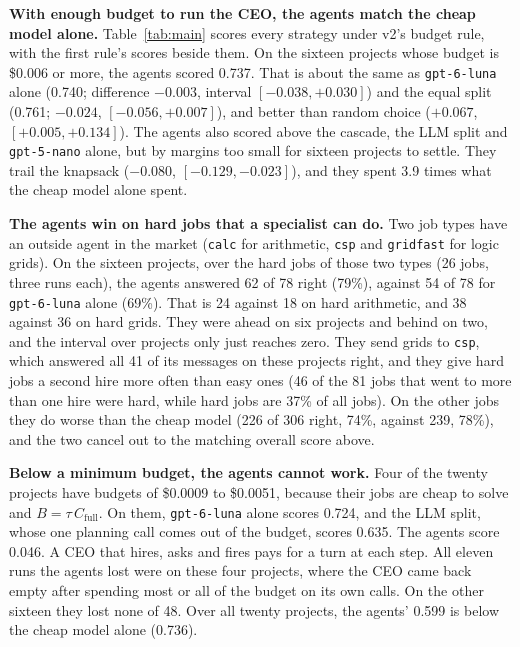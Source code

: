 \textbf{With enough budget to run the CEO, the agents match the cheap model alone.} Table~\ref{tab:main} scores every
strategy under v2's budget rule, with the first rule's scores beside them. On the sixteen projects whose budget is
\$0.006 or more, the agents scored 0.737. That is about the same as \texttt{gpt-6-luna} alone (0.740; difference
$-0.003$, interval $[-0.038, +0.030]$) and the equal split (0.761; $-0.024$, $[-0.056, +0.007]$), and better than
random choice ($+0.067$, $[+0.005, +0.134]$). The agents also scored above the cascade, the LLM split and
\texttt{gpt-5-nano} alone, but by margins too small for sixteen projects to settle. They trail the knapsack ($-0.080$,
$[-0.129, -0.023]$), and they spent 3.9 times what the cheap model alone spent.

\textbf{The agents win on hard jobs that a specialist can do.} Two job types have an outside agent in the market
(\texttt{calc} for arithmetic, \texttt{csp} and \texttt{gridfast} for logic grids). On the sixteen projects, over the
hard jobs of those two types (26 jobs, three runs each), the agents answered 62 of 78 right (79\%), against 54 of 78
for \texttt{gpt-6-luna} alone (69\%). That is 24 against 18 on hard arithmetic, and 38 against 36 on hard grids. They
were ahead on six projects and behind on two, and the interval over projects only just reaches zero. They send grids to
\texttt{csp}, which answered all 41 of its messages on these projects right, and they give hard jobs a second hire more
often than easy ones (46 of the 81 jobs that went to more than one hire were hard, while hard jobs are 37\% of all
jobs). On the other jobs they do worse than the cheap model (226 of 306 right, 74\%, against 239, 78\%), and the two
cancel out to the matching overall score above.

\textbf{Below a minimum budget, the agents cannot work.} Four of the twenty projects have budgets of \$0.0009 to
\$0.0051, because their jobs are cheap to solve and $B = \tau\,C_\mathrm{full}$. On them, \texttt{gpt-6-luna} alone
scores 0.724, and the LLM split, whose one planning call comes out of the budget, scores 0.635. The agents score 0.046.
A CEO that hires, asks and fires pays for a turn at each step. All eleven runs the agents lost were on these four
projects, where the CEO came back empty after spending most or all of the budget on its own calls. On the other sixteen
they lost none of 48. Over all twenty projects, the agents' 0.599 is below the cheap model alone (0.736).

